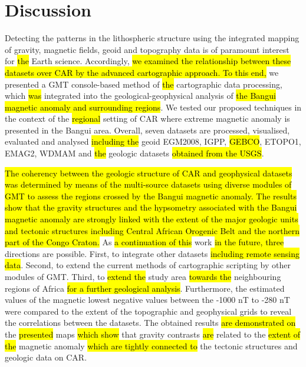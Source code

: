 \documentclass[minerals,article,submit,pdftex,moreauthors]{Definitions/mdpi}
\begin{document}
\section{Discussion}
Detecting the patterns in the lithospheric structure using the integrated mapping of gravity, magnetic fields, geoid and topography data is of paramount interest for \hl{the }Earth science. Accordingly, \hl{we examined the relationship between these datasets over CAR by the advanced cartographic approach. To this end, }we\hl{ }presented a GMT console-based method of \hl{the }cartographic data processing, which \hl{was} integrated into the geological-geophysical analysis of \hl{the Bangui magnetic anomaly and surrounding regions}. We\hl{ }tested our proposed techniques in the context of the \hl{regional} setting of CAR where extreme magnetic anomaly is presented in the Bangui area. Overall, seven datasets are processed, visualised, evaluated and analysed \hl{including the }geoid EGM2008, IGPP, \hl{GEBCO}, ETOPO1, EMAG2, WDMAM and \hl{the} geologic datasets \hl{obtained from the USGS}. 

\hl{The coherency between the geologic structure of CAR and geophysical datasets was determined by means of the multi-source datasets using diverse modules of GMT to assess the regions crossed by the Bangui magnetic anomaly. The results show that the gravity structures and the hypsometry associated with the Bangui magnetic anomaly are strongly linked with the extent of the major geologic units and tectonic structures including Central African Orogenic Belt and the northern part of the Congo Craton. }As \hl{a continuation of this }work \hl{in the future, three} directions are possible. First, to integrate other datasets \hl{including remote sensing data}. Second, to extend the current methods of cartographic scripting by other modules of GMT. Third, to \hl{extend the } study area \hl{towards the} neighbouring regions of Africa \hl{for a further geological analysis}. Furthermore, the estimated values of the magnetic lowest negative values between the -1000 nT to -280 nT were compared to the extent of the topographic and geophysical grids to reveal the correlations between the datasets. The obtained results \hl{are demonstrated on} the \hl{presented }maps \hl{which show }that\hl{ }gravity contrasts \hl{are }related to the \hl{extent of the }magnetic anomaly \hl{which are tightly connected to} the tectonic structures and geologic data on CAR. 
\end{document}
